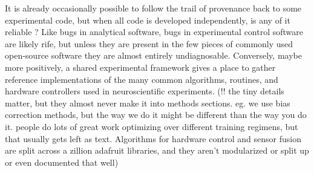 \documentclass[11pt]{article}
\begin{document}
\begin{multicols}{2}
It is already occasionally possible to follow the trail of provenance
back to some experimental code, but when all code is developed
independently, is any of it reliable \cite{wallReliabilityStartsExperimental2018} ? Like bugs in analytical
software, bugs in experimental control software are likely rife, but
unless they are present in the few pieces of commonly used open-source
software they are almost entirely undiagnosable. Conversely, maybe more
positively, a shared experimental framework gives a place to gather
reference implementations of the many common algorithms, routines, and
hardware controllers used in neuroscientific experiments. (!! the tiny
details matter, but they almost never make it into methods sections. eg.
we use bias correction methods, but the way we do it might be different
than the way you do it. people do lots of great work optimizing over
different training regimens, but that usually gets left as text.
Algorithms for hardware control and sensor fusion are split across a
zillion adafruit libraries, and they aren't modularized or split up or
even documented that well)


\end{multicols}
\end{document}
